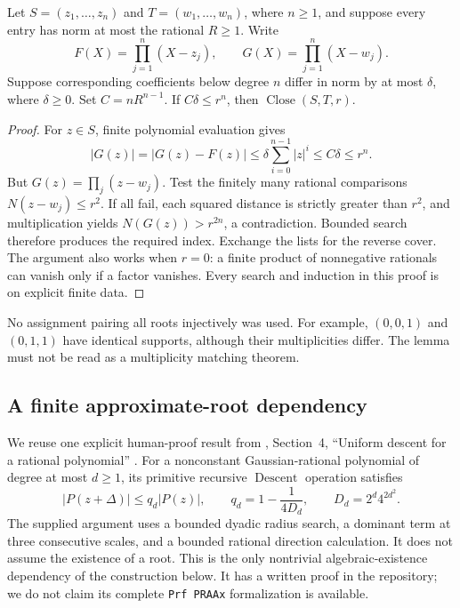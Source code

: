 \begin{lemma}\label{lem:product-stability}
Let \(S=(z_1,\ldots,z_n)\) and \(T=(w_1,\ldots,w_n)\), where \(n\ge1\),
and suppose every entry has norm at most the rational \(R\ge1\). Write
\[
 F(X)=\prod_{j=1}^n(X-z_j),\qquad
 G(X)=\prod_{j=1}^n(X-w_j).
\]
Suppose corresponding coefficients below degree \(n\) differ in norm
by at most \(\delta\), where \(\delta\ge0\). Set
\(C=nR^{n-1}\). If \(C\delta\le r^n\), then
\(\operatorname{Close}(S,T,r)\).
\end{lemma}

\begin{proof}
For \(z\in S\), finite polynomial evaluation gives
\[
 |G(z)|=|G(z)-F(z)|
 \le\delta\sum_{i=0}^{n-1}|z|^i
 \le C\delta\le r^n.
\]
But \(G(z)=\prod_j(z-w_j)\). Test the finitely many rational comparisons
\(N(z-w_j)\le r^2\). If all fail, each squared distance is strictly
greater than \(r^2\), and multiplication yields
\(N(G(z))>r^{2n}\), a contradiction. Bounded search therefore produces
the required index. Exchange the lists for the reverse cover. The
argument also works when \(r=0\): a finite product of nonnegative
rationals can vanish only if a factor vanishes. Every search and
induction in this proof is on explicit finite data.
\end{proof}

No assignment pairing all roots injectively was used. For example,
\((0,0,1)\) and \((0,1,1)\) have identical supports, although their
multiplicities differ. The lemma must not be read as a multiplicity
matching theorem.

\subsection{A finite approximate-root dependency}

We reuse one explicit human-proof result from
, Section~4, ``Uniform descent
for a rational polynomial'' \cite{repo-fta}. For a nonconstant Gaussian-rational
polynomial of degree at most \(d\ge1\), its primitive recursive
\(\operatorname{Descent}\) operation satisfies
\[
 |P(z+\Delta)|\le q_d|P(z)|,
 \qquad q_d=1-\frac1{4D_d},\qquad D_d=2^d4^{2d^2}.
 \tag{RD}\label{eq:rational-descent}
\]
The supplied argument uses a bounded dyadic radius search, a dominant
term at three consecutive scales, and a bounded rational direction
calculation. It does not assume the existence of a root. This is the
only nontrivial algebraic-existence dependency of the construction below.
It has a written proof in the repository; we do not claim its complete
\texttt{Prf PRAAx} formalization is available.

